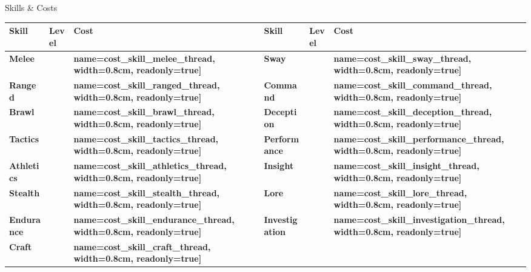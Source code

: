 \documentclass[10pt]{article}
\newcommand{\skilldots}[1]{%
  \TextField[
    name=#1,
    bordercolor={0 0 0},
    backgroundcolor={255 255 255},
    readonly=false,
    width=1.5cm,
    height=0.45cm,
    maxlen=1,
    chars=2,
    align=0,
    default=0
  ]{}%
  \hspace{-0.2em}%
  \raisebox{0.4ex}{%
    \small%
    \textcolor{gray}{%
      \(\bigcirc\)\(\bigcirc\)\(\bigcirc\)\(\bigcirc\)\(\bigcirc\)%
    }%
  }%
}
\newcommand{\tf}[1]{\TextField[#1]{}}
\begin{document}
\begin{Form}
\begin{minipage}[t]{0.48\linewidth}
    \begin{charbox}{Skills \& Costs}
        \begin{tabular}{>{\bfseries}p{2.5cm} >{\bfseries}p{1.5cm} >{\bfseries}p{1.5cm} >{\bfseries}p{2.5cm} >{\bfseries}p{1.5cm} >{\bfseries}p{1.5cm}}
            \toprule
            \textbf{Skill} & \textbf{Level} & \textbf{Cost} & \textbf{Skill} & \textbf{Level} & \textbf{Cost} \\
            \midrule
            Melee & \skilldots{skill_melee_thread} & \tf[name=cost_skill_melee_thread, width=0.8cm, readonly=true]{} & 
            Sway & \skilldots{skill_sway_thread} & \tf[name=cost_skill_sway_thread, width=0.8cm, readonly=true]{} \\
            Ranged & \skilldots{skill_ranged_thread} & \tf[name=cost_skill_ranged_thread, width=0.8cm, readonly=true]{} & 
            Command & \skilldots{skill_command_thread} & \tf[name=cost_skill_command_thread, width=0.8cm, readonly=true]{} \\
            Brawl & \skilldots{skill_brawl_thread} & \tf[name=cost_skill_brawl_thread, width=0.8cm, readonly=true]{} & 
            Deception & \skilldots{skill_deception_thread} & \tf[name=cost_skill_deception_thread, width=0.8cm, readonly=true]{} \\
            Tactics & \skilldots{skill_tactics_thread} & \tf[name=cost_skill_tactics_thread, width=0.8cm, readonly=true]{} & 
            Performance & \skilldots{skill_performance_thread} & \tf[name=cost_skill_performance_thread, width=0.8cm, readonly=true]{} \\
            Athletics & \skilldots{skill_athletics_thread} & \tf[name=cost_skill_athletics_thread, width=0.8cm, readonly=true]{} & 
            Insight & \skilldots{skill_insight_thread} & \tf[name=cost_skill_insight_thread, width=0.8cm, readonly=true]{} \\
            Stealth & \skilldots{skill_stealth_thread} & \tf[name=cost_skill_stealth_thread, width=0.8cm, readonly=true]{} & 
            Lore & \skilldots{skill_lore_thread} & \tf[name=cost_skill_lore_thread, width=0.8cm, readonly=true]{} \\
            Endurance & \skilldots{skill_endurance_thread} & \tf[name=cost_skill_endurance_thread, width=0.8cm, readonly=true]{} & 
            Investigation & \skilldots{skill_investigation_thread} & \tf[name=cost_skill_investigation_thread, width=0.8cm, readonly=true]{} \\
            Craft & \skilldots{skill_craft_thread} & \tf[name=cost_skill_craft_thread, width=0.8cm, readonly=true]{} & 

\end{tabular}
\end{charbox}
\end{minipage}
\end{Form}
\end{document}
